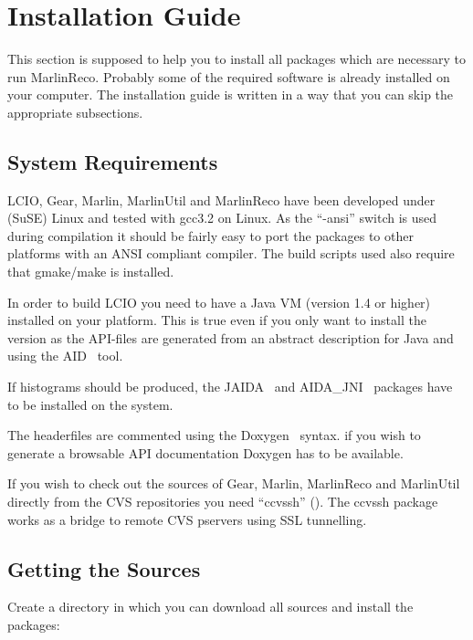 \section{Installation Guide} \label{sec:install}

This section is supposed to help you to install all packages which are 
necessary to run MarlinReco. Probably some of the required software is 
already installed on your computer. The installation guide is written 
in a way that you can skip the appropriate subsections. 

\subsection{System Requirements}

LCIO, Gear, Marlin, MarlinUtil and MarlinReco have been 
developed under (SuSE) Linux and tested with gcc3.2 on Linux. 
As the ``-ansi'' switch is used during compilation
it should be fairly easy to 
port the packages to other platforms with an ANSI compliant \CPP{} compiler.
The build scripts used also require that gmake/make is installed.

In order to build LCIO you need to have a Java VM (version 1.4 or
higher) installed on your platform. This is true even if you only want
to install the \CPP{} version as the API-files are generated from an
abstract description for Java and \CPP{} using the AID~\cite{ref_aid} tool.

If histograms should be produced, the JAIDA~\cite{ref_jaida} and 
AIDA\_JNI~\cite{ref_aidajni} packages have 
to be installed on the system. 

The headerfiles are commented using the Doxygen~\cite{ref_doxygen} syntax. 
if you wish to generate a browsable API documentation Doxygen 
has to be available.

If you wish to check out the sources of Gear, Marlin, MarlinReco
and MarlinUtil directly from the CVS repositories you need
``ccvssh''
(). 
The ccvssh package works as a bridge to remote CVS
pservers using SSL tunnelling.  

\subsection{Getting the Sources}

Create a directory in which you can download all sources and install 
the packages:

